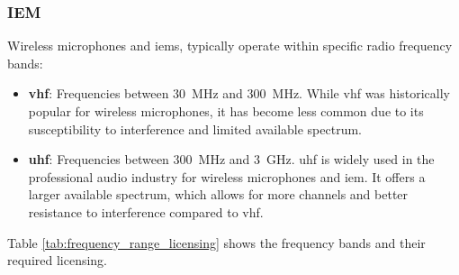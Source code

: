         \subsubsection{IEM}
            Wireless microphones and \acrshort{iem}s, typically operate within specific radio frequency bands:

            \begin{itemize}
                \item \textbf{\acrfull{vhf}}: Frequencies between \SI{30}{\MHz} and \SI{300}{\MHz}. While \acrshort{vhf} was historically popular for wireless microphones, it has become less common due to its susceptibility to interference and limited available spectrum.
                \item \textbf{\acrfull{uhf}}: Frequencies between \SI{300}{\MHz} and \SI{3}{\GHz}. \acrshort{uhf} is widely used in the professional audio industry for wireless microphones and \acrshort{iem}. It offers a larger available spectrum, which allows for more channels and better resistance to interference compared to \acrshort{vhf}.
            \end{itemize}

            \citep{shure2024}

            Table \ref{tab:frequency_range_licensing} shows the frequency bands and their required licensing.


